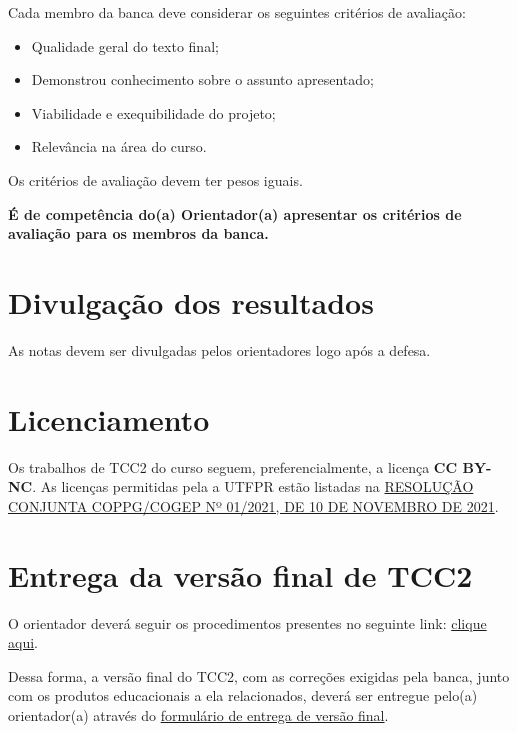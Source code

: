 \documentclass[a4paper, 12pt]{article}
\begin{document}
	Cada membro da banca deve considerar os seguintes critérios de avaliação:
	
	\begin{itemize}
		\item Qualidade geral do texto final;
		\item Demonstrou conhecimento sobre o assunto apresentado;
		\item Viabilidade e exequibilidade do projeto;
		\item Relevância na área do curso.
	\end{itemize}

	Os critérios de avaliação devem ter pesos iguais.

	\textbf{É de competência do(a) Orientador(a) apresentar os critérios de avaliação para os membros da banca.}	
	
	\section{Divulgação dos resultados}
	
	As notas devem ser divulgadas pelos orientadores logo após a defesa.
	
	\section{Licenciamento}
	
	Os trabalhos de TCC2 do curso seguem, preferencialmente, a licença \textbf{CC BY-NC}. As licenças permitidas pela a UTFPR estão listadas na \href{https://sei.utfpr.edu.br/sei/publicacoes/controlador_publicacoes.php?acao=publicacao_visualizar&id_documento=2615190&id_orgao_publicacao=0}{RESOLUÇÃO CONJUNTA COPPG/COGEP Nº 01/2021, DE 10 DE NOVEMBRO DE 2021}.
	
	\section{Entrega da versão final de TCC2}
	
	O orientador deverá seguir os procedimentos presentes no seguinte link: \href{http://portal.utfpr.edu.br/biblioteca/trabalhos-academicos/docentes/procedimento-de-entrega-graduacao}{clique aqui}.
	
	Dessa forma, a versão final do TCC2, com as correções exigidas pela banca, junto com os produtos educacionais a ela relacionados, deverá ser entregue pelo(a) orientador(a) através do \href{https://forms.gle/LScHkAtDPReTjki46}{formulário de entrega de versão final}. 
	
\end{document}
